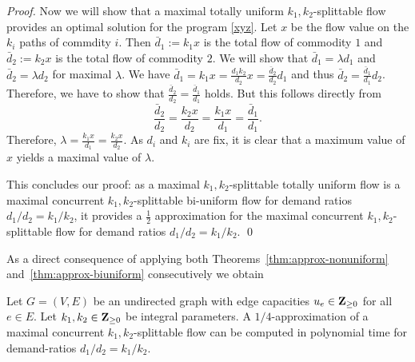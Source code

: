 \begin{proof}
Now we will show that a maximal totally uniform $k_1,k_2$-splittable
flow provides an optimal solution for the program \eqref{xyz}. Let
$x$ be the flow value on the $k_i$ paths of commdity $i$. Then 
$\bar{d}_1 := k_1x$ is the total flow of commodity $1$ and 
$\bar{d}_2 := k_2x$ is the total flow of commodity $2$. We will 
show that $\bar{d}_1 = \lambda d_1$ and $\bar{d}_2 = \lambda d_2$
for maximal $\lambda$.
We have $\bar{d}_1 = k_1x = \frac{d_1k_2}{d_2}x = \frac{\bar{d}_2}{d_2} d_1$
and thus $\bar{d}_2 = \frac{\bar{d}_1}{d_1}d_2$. Therefore, we
have to show that $\frac{\bar{d}_2}{d_2} = \frac{\bar{d}_1}{d_1}$
holds. But this follows directly from  
\begin{displaymath}
 \frac{\bar{d}_2}{d_2} =\frac{k_2x}{d_2} = \frac{k_1x}{d_1}= \frac{\bar{d}_1}{d_1}.
\end{displaymath}
Therefore, $\lambda =  \frac{k_1x}{d_1} =  \frac{k_2x}{d_2}$.
As $d_i$ and $k_i$ are fix, it is clear that a maximum value
of $x$ yields a maximal value of $\lambda$.

This concludes our proof: as a maximal $k_1,k_2$-splittable totally 
uniform flow is a maximal concurrent 
$k_1,k_2$-splittable bi-uniform flow for demand ratios $d_1/d_2 = k_1/k_2$, 
it provides a $\frac{1}{2}$ approximation for the maximal concurrent 
$k_1,k_2$-splittable flow for demand ratios $d_1/d_2 = k_1/k_2$.
\qed \end{proof}

As a direct consequence of applying both
Theorems~\ref{thm:approx-nonuniform} and~\ref{thm:approx-biuniform}
consecutively we obtain

\begin{corollary}
  Let $G=(V,E)$ be an undirected graph with edge capacities
  $u_e\in\mathbf{Z}_{\geq0}$ for all $e\in E$. Let $k_1,k_2\in\mathbf{Z}_{\geq0}$ be
  integral parameters. A $1/4$-approximation of a maximal 
  concurrent $k_1,k_2$-splittable flow can be computed in polynomial
  time for demand-ratios $d_1/d_2 = k_1/k_2$.
\end{corollary}






